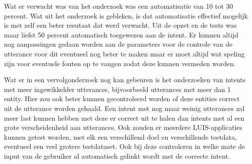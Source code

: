 Wat er verwacht was van het onderzoek was een automatisatie van 10 tot 30 percent. Wat uit het onderzoek is gebleken, is dat automatisatie effectief mogelijk is met zelf een beter resutaat dat werd verwacht. Uit de opzet en de tests was maar liefst 50 percent automatisch toegewezen aan de intent. Er kunnen altijd nog aanpassingen gedaan worden aan de parameters voor de controle van de utterance voor dit eventueel nog beter te maken maar er moet altijd wat speling zijn voor eventuele fouten op te vangen zodat deze kunnen vermeden worden.

Wat er in een vervolgonderzoek nog kan gebeuren is het onderzoeken van intents met meer ingewikkelder utterances, bijvoorbeeld utterances met meer dan 1 entity. Hier zou ook beter kunnen gecontroleerd worden of deze entities correct uit de utterance worden gehaald. Een intent met nog maar weinig utterances zal meer last kunnen hebben met deze er correct uit te halen dan intents met al een grote verscheidenheid aan utterances. Ook zouden er meerdere LUIS-applicaties kunnen getest worden, met elk een verschillend doel en verschillende testdata, eventueel een veel grotere testdataset. Ook bij deze controleren in welke mate de input van de gebruiker al automatisch gelinkt wordt met de correcte intent.



